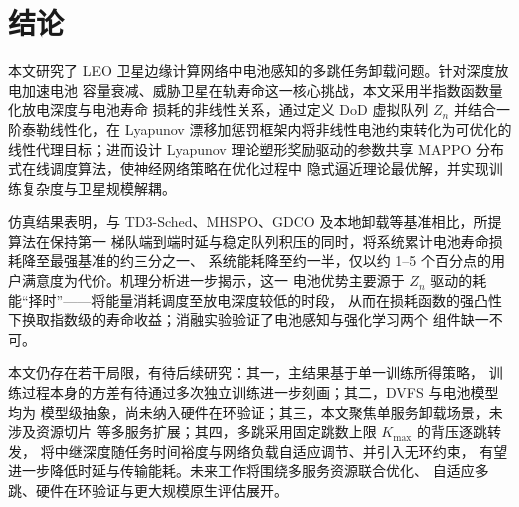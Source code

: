 \documentclass[a4paper,11pt]{article}
\begin{document}
\section{结论}
\label{sec:conclusion}

本文研究了 LEO 卫星边缘计算网络中电池感知的多跳任务卸载问题。针对深度放电加速电池
容量衰减、威胁卫星在轨寿命这一核心挑战，本文采用半指数函数量化放电深度与电池寿命
损耗的非线性关系，通过定义 DoD 虚拟队列 $Z_n$ 并结合一阶泰勒线性化，在 Lyapunov
漂移加惩罚框架内将非线性电池约束转化为可优化的线性代理目标；进而设计 Lyapunov
理论塑形奖励驱动的参数共享 MAPPO 分布式在线调度算法，使神经网络策略在优化过程中
隐式逼近理论最优解，并实现训练复杂度与卫星规模解耦。

仿真结果表明，与 TD3-Sched、MHSPO、GDCO 及本地卸载等基准相比，所提算法在保持第一
梯队端到端时延与稳定队列积压的同时，将系统累计电池寿命损耗降至最强基准的约三分之一、
系统能耗降至约一半，仅以约 1--5 个百分点的用户满意度为代价。机理分析进一步揭示，这一
电池优势主要源于 $Z_n$ 驱动的耗能``择时''——将能量消耗调度至放电深度较低的时段，
从而在损耗函数的强凸性下换取指数级的寿命收益；消融实验验证了电池感知与强化学习两个
组件缺一不可。

本文仍存在若干局限，有待后续研究：其一，主结果基于单一训练所得策略，
训练过程本身的方差有待通过多次独立训练进一步刻画；其二，DVFS 与电池模型均为
模型级抽象，尚未纳入硬件在环验证；其三，本文聚焦单服务卸载场景，未涉及资源切片
等多服务扩展；其四，多跳采用固定跳数上限 $K_{\max}$ 的背压逐跳转发，
将中继深度随任务时间裕度与网络负载自适应调节、并引入无环约束，
有望进一步降低时延与传输能耗。未来工作将围绕多服务资源联合优化、
自适应多跳、硬件在环验证与更大规模原生评估展开。
\end{document}
